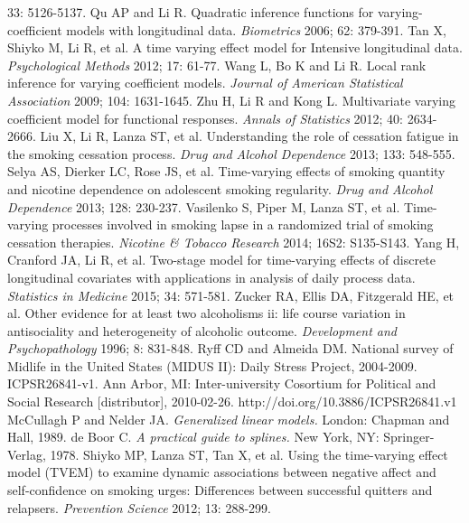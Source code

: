 \begin{thebibliography}
33: 5126-5137.
      Qu AP and Li R. Quadratic inference functions for
     varying-coefficient models with longitudinal data. \textit{Biometrics} 2006; 62: 379-391.
      Tan X, Shiyko M, Li R, et al. A time varying effect model for Intensive longitudinal data. \textit{Psychological Methods} 2012;
     17: 61-77.
      Wang L, Bo K and Li R. Local rank inference
     for varying coefficient models. \textit{Journal of American Statistical Association} 2009; 104: 1631-1645.
      Zhu H, Li R and Kong L. Multivariate varying coefficient model for functional responses. \textit{Annals of
     Statistics} 2012; 40: 2634-2666.
       Liu X, Li R, Lanza ST, et al. Understanding the role of cessation fatigue in the smoking
cessation process. \textit{Drug and Alcohol Dependence} 2013; 133:
548-555.
      Selya AS, Dierker LC, Rose JS, et al.
Time-varying effects of smoking quantity and nicotine dependence
on adolescent smoking regularity. \textit{Drug and Alcohol
Dependence} 2013; 128: 230-237.
       Vasilenko S, Piper M, Lanza ST, et al. Time-varying processes involved in smoking lapse in a randomized
trial of smoking cessation therapies. \textit{Nicotine & Tobacco
Research} 2014; 16S2: S135-S143.
       Yang H, Cranford JA, Li R, et al.
Two-stage model for time-varying effects of discrete longitudinal
covariates with applications in analysis of daily process data.
\textit{Statistics in Medicine} 2015; 34: 571-581.
       Zucker RA, Ellis DA, Fitzgerald HE, et al. Other evidence for at least two alcoholisms ii: life course
variation
  in antisociality and heterogeneity of alcoholic outcome.
\textit{Development and Psychopathology} 1996; 8: 831-848.
       Ryff CD and Almeida DM. National survey of
      Midlife in the United States (MIDUS II): Daily Stress
      Project, 2004-2009. ICPSR26841-v1. Ann Arbor, MI:
      Inter-university Cosortium for Political and Social Research
      [distributor], 2010-02-26.
      http://doi.org/10.3886/ICPSR26841.v1
       McCullagh P and Nelder JA. \textit{Generalized linear models.} London: Chapman and Hall, 1989.
       de Boor C. \textit{A practical guide to splines.} New York, NY: Springer-Verlag, 1978.
       Shiyko MP, Lanza ST, Tan X, et al. Using the time-varying effect model (TVEM)
        to examine dynamic associations between negative affect and self-confidence on smoking urges:
        Differences between successful quitters and relapsers. \textit{Prevention Science} 2012; 13: 288-299.

\end{thebibliography}
